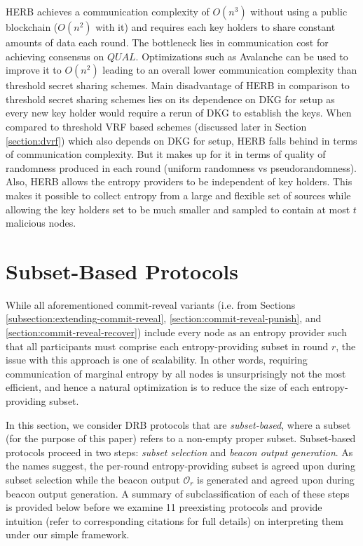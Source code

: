 \documentclass[letterpaper,twocolumn,10pt]{article}
\theoremstyle{definition}
\theoremstyle{remark}
\begin{document}
HERB achieves a communication complexity of $O(n^3)$ without using a public blockchain ($O(n^2)$ with it) and requires each key holders to share constant amounts of data each round. The bottleneck lies in communication cost for achieving consensus on $QUAL$. Optimizations such as Avalanche \cite{rocket2018snowflake} can be used to improve it to $O(n^2)$ leading to an overall lower communication complexity than threshold secret sharing schemes. Main disadvantage of HERB in comparison to threshold secret sharing schemes lies on its dependence on DKG for setup as every new key holder would require a rerun of DKG to establish the keys. When compared to threshold VRF based schemes (discussed later in Section \ref{section:dvrf}) which also depends on DKG for setup, HERB falls behind in terms of communication complexity. But it makes up for it in terms of quality of randomness produced in each round (uniform randomness vs pseudorandomness). Also, HERB allows the entropy providers to be independent of key holders. This makes it possible to collect entropy from a large and flexible set of sources while allowing the key holders set to be much smaller and sampled to contain at most $t$ malicious nodes.


\section{Subset-Based Protocols}
\label{section:subset-based}
While all aforementioned commit-reveal variants (i.e. from Sections \ref{subsection:extending-commit-reveal}, \ref{section:commit-reveal-punish}, and \ref{section:commit-reveal-recover}) include every node as an entropy provider such that all participants must comprise each entropy-providing subset in round $r$, the issue with this approach is one of scalability. In other words, requiring communication of marginal entropy by all nodes is unsurprisingly not the most efficient, and hence a natural optimization is to reduce the size of each entropy-providing subset.

In this section, we consider DRB protocols that are \textit{subset-based}, where a subset (for the purpose of this paper) refers to a non-empty proper subset. Subset-based protocols proceed in two steps: \textit{subset selection} and \textit{beacon output generation}. As the names suggest, the per-round entropy-providing subset is agreed upon during subset selection while the beacon output $\mathcal{O}_r$ is generated and agreed upon during beacon output generation. A summary of subclassification of each of these steps is provided below before we examine 11 preexisting protocols and provide intuition (refer to corresponding citations for full details) on interpreting them under our simple framework.
\end{document}
